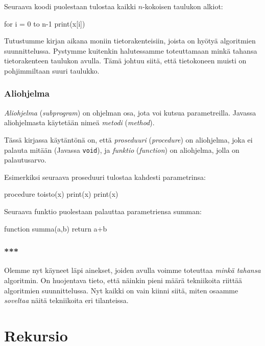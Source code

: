 Seuraava koodi puolestaan tulostaa kaikki
$n$-kokoisen taulukon alkiot:

\begin{code}
for i = 0 to n-1
    print(x[i])
\end{code}

Tutustumme kirjan aikana moniin tietorakenteisiin,
joista on hyötyä algoritmien suunnittelussa.
Pystymme kuitenkin halutessamme toteuttamaan
minkä tahansa tietorakenteen taulukon avulla.
Tämä johtuu siitä, että tietokoneen muisti
on pohjimmiltaan suuri taulukko.

\subsubsection{Aliohjelma}


\emph{Aliohjelma} (\emph{subprogram}) on ohjelman osa, jota voi kutsua parametreilla.
Javassa aliohjelmasta käytetään nimeä \emph{metodi} (\emph{method}).

Tässä kirjassa käytäntönä on,
että \emph{proseduuri} (\emph{procedure}) on aliohjelma,
joka ei palauta mitään (Javassa \texttt{void}),
ja \emph{funktio} (\emph{function}) on aliohjelma,
jolla on palautusarvo.

Esimerkiksi seuraava proseduuri tulostaa kahdesti parametrinsa:

\begin{code}
procedure toisto(x)
    print(x)
    print(x)
\end{code}

Seuraava funktio puolestaan palauttaa
parametriensa summan:

\begin{code}
function summa(a,b)
    return a+b
\end{code}

\subsubsection{***}

Olemme nyt käyneet läpi ainekset,
joiden avulla voimme toteuttaa \emph{minkä tahansa} algoritmin.
On huojentava tieto, että näinkin pieni määrä tekniikoita
riittää algoritmien suunnittelussa.
Nyt kaikki on vain kiinni siitä, miten osaamme \emph{soveltaa}
näitä tekniikoita eri tilanteissa.

\section{Rekursio}

